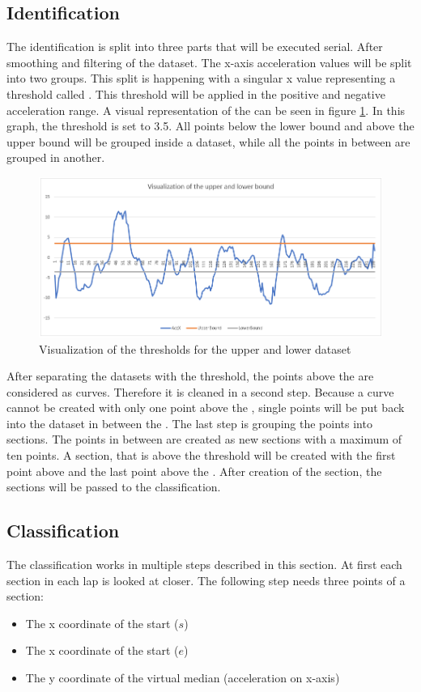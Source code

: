 \subsection{Identification}\label{identification}
The identification is split into three parts that will be executed serial. After smoothing and filtering of the dataset. The x-axis acceleration values will be split into two groups. This split is happening with a singular x value representing a threshold called . This threshold will be applied in the positive and negative acceleration range. A visual representation of the  can be seen in figure \ref{upperlowerBound}. In this graph, the threshold is set to 3.5. All points below the lower bound and above the upper bound will be grouped inside a dataset, while all the points in between are grouped in another.
\begin{figure}[H]
	\centering
	\includegraphics[scale= 0.6]{Pictures/upperandlowerbound.png}
	\caption{Visualization of the thresholds for the upper and lower dataset}
	\label{upperlowerBound}
\end{figure}
After separating the datasets with the threshold, the points above the  are considered as curves. Therefore it is cleaned in a second step. Because a curve cannot be created with only one point above the , single points will be put back into the dataset in between the . The last step is grouping the points into sections. The points in between are created as new sections with a maximum of ten points. A section, that is above the threshold will be created with the first point above and the last point above the . After creation of the section, the sections will be passed to the classification.

\subsection{Classification}\label{classification}
The classification works in multiple steps described in this section. At first each section in each lap is looked at closer. The following step needs three points of a section:
\begin{itemize}
	\item The x coordinate of the start ($s$)
	\item The x coordinate of the start ($e$)
	\item The y coordinate of the virtual median (acceleration on x-axis)
\end{itemize}

